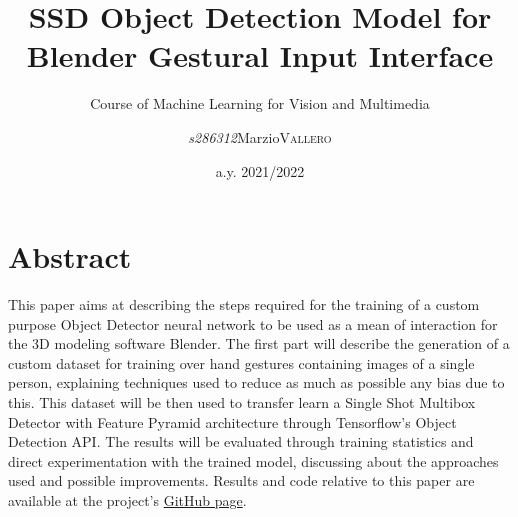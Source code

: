 \documentclass[a4paper, 12pt]{article}
\institute{Politecnico di Torino}
\title{SSD Object Detection Model for Blender Gestural Input Interface}
\subtitle{Course of Machine Learning for Vision and Multimedia}
\author{\textit{s286312}\quad Marzio\quad \textsc{Vallero}\linebreak}
\date{a.y. 2021/2022}
\begin{document}
\maketitle
\twocolumn
\sloppy

\section{Abstract}
\begin{flushleft}
This paper aims at describing the steps required for the training of a custom purpose Object Detector neural network to be used as a mean of interaction for the 3D modeling software Blender. The first part will describe the generation of a custom dataset for training over hand gestures containing images of a single person, explaining techniques used to reduce as much as possible any bias due to this.\linebreak
This dataset will be then used to transfer learn a Single Shot Multibox Detector with Feature Pyramid architecture through Tensorflow's Object Detection API.
The results will be evaluated through training statistics and direct experimentation with the trained model, discussing about the approaches used and possible improvements.
Results and code relative to this paper are available at the project's \href{https://github.com/MarzioVallero/ML-Based-Blender-Gestural-Input-Interface}{GitHub page}.
\end{flushleft}
\end{document}
